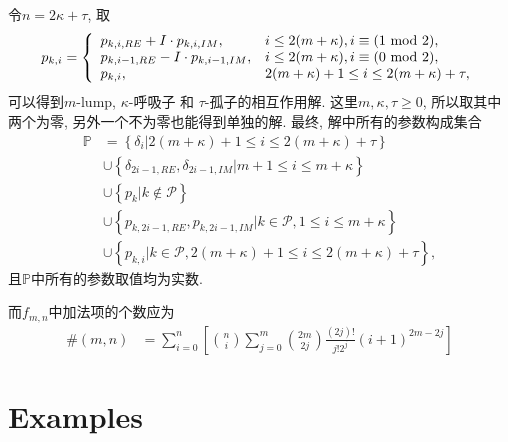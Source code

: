 \documentclass{article}
\newcommand{\mbrace}[1]{\left[#1\right]}
\newcommand{\bbrace}[1]{\left\{#1\right\}}
\newcommand{\PS}{\mathcal{P}}
\renewcommand{\mod}{{\rm ~mod~}}
\begin{document}
令$n=2\kappa+\tau$, 取
\begin{equation}
p_{k,i}=\left\{
\begin{array}{ll}
  p_{k,i,RE}+I\cdot p_{k,i,IM}, & i\le 2(m+\kappa), i\equiv(1 \mod 2),\\
  p_{k,i-1,RE}-I\cdot p_{k,i-1,IM}, & i\le 2(m+\kappa), i\equiv(0 \mod 2),\\
  p_{k,i}, & 2(m+\kappa)+1 \le i \le 2(m+\kappa)+\tau ,
\end{array}
\right.
\end{equation}
可以得到$m$-lump, $\kappa$-呼吸子 和 $\tau$-孤子的相互作用解. 这里$m,\kappa,\tau\ge 0$, 所以取其中两个为零, 另外一个不为零也能得到单独的解. 最终, 解中所有的参数构成集合
\begin{equation}
\begin{aligned}
\mathbb{P}
&=\bbrace{\delta_i|2(m+\kappa)+1 \le i \le 2(m+\kappa)+\tau}  \\
&\cup\bbrace{\delta_{2i-1,RE},\delta_{2i-1,IM}|m+1\le i \le m+\kappa} \\ 
&\cup\bbrace{p_k|k\not\in \PS} \\
&\cup\bbrace{p_{k,2i-1,RE},p_{k,2i-1,IM}|k\in\PS,1\le i \le m+\kappa} \\
&\cup\bbrace{p_{k,i}|k\in\PS,2(m+\kappa)+1 \le i \le 2(m+\kappa)+\tau},
\end{aligned}
\end{equation}
且$\mathbb P$中所有的参数取值均为实数. 

而$f_{m,n}$中加法项的个数应为
\begin{equation}
\begin{aligned}
\#(m,n)&=\sum_{i=0}^n\mbrace{\binom{n}{i}\sum_{j=0}^m{\binom{2m}{2j}\frac{(2j)!}{j!2^j}(i+1)^{2m-2j}}}
\end{aligned}
\end{equation}

\section{Examples}
\end{document}
